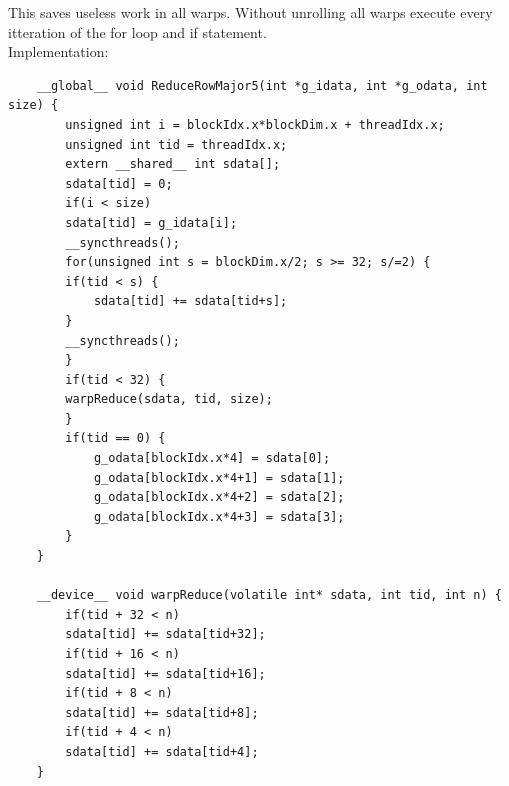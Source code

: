 \documentclass[a4paper, 14pt]{article}
\begin{document}
	This saves useless work in all warps. Without unrolling all warps execute every itteration of the for loop and if statement.
	\\
	Implementation:
	\begin{lstlisting}
	__global__ void ReduceRowMajor5(int *g_idata, int *g_odata, int size) {
		unsigned int i = blockIdx.x*blockDim.x + threadIdx.x;	
		unsigned int tid = threadIdx.x;
		extern __shared__ int sdata[];
		sdata[tid] = 0;
		if(i < size)
		sdata[tid] = g_idata[i];
		__syncthreads();
		for(unsigned int s = blockDim.x/2; s >= 32; s/=2) {
		if(tid < s) {
			sdata[tid] += sdata[tid+s];
		}	
		__syncthreads();
		}
		if(tid < 32) {
		warpReduce(sdata, tid, size);
		}
		if(tid == 0) {
			g_odata[blockIdx.x*4] = sdata[0];
			g_odata[blockIdx.x*4+1] = sdata[1];
			g_odata[blockIdx.x*4+2] = sdata[2];
			g_odata[blockIdx.x*4+3] = sdata[3];
		}
	}
	
	__device__ void warpReduce(volatile int* sdata, int tid, int n) {
		if(tid + 32 < n)
		sdata[tid] += sdata[tid+32];
		if(tid + 16 < n)
		sdata[tid] += sdata[tid+16];
		if(tid + 8 < n)	
		sdata[tid] += sdata[tid+8];
		if(tid + 4 < n)	
		sdata[tid] += sdata[tid+4];
	}
	\end{lstlisting}
\end{document}
